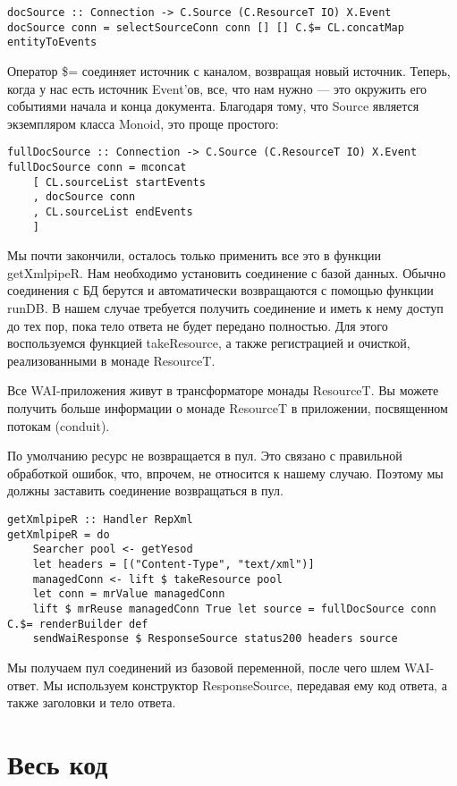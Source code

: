 \begin{lstlisting}
docSource :: Connection -> C.Source (C.ResourceT IO) X.Event
docSource conn = selectSourceConn conn [] [] C.$= CL.concatMap entityToEvents
\end{lstlisting}%

Оператор \$= соединяет источник с каналом, возвращая новый источник. Теперь, когда у нас есть источник Event'ов, все, что нам нужно --- это окружить его событиями начала и конца документа. Благодаря тому, что Source является экземпляром класса Monoid, это проще простого:

\begin{lstlisting}
fullDocSource :: Connection -> C.Source (C.ResourceT IO) X.Event
fullDocSource conn = mconcat
    [ CL.sourceList startEvents
    , docSource conn
    , CL.sourceList endEvents
    ]
\end{lstlisting}

Мы почти закончили, осталось только применить все это в функции getXmlpipeR. Нам необходимо установить соединение с базой данных. Обычно соединения с БД берутся и автоматически возвращаются с помощью функции runDB. В нашем случае требуется получить соединение и иметь к нему доступ до тех пор, пока тело ответа не будет передано полностью. Для этого воспользуемся функцией takeResource, а также регистрацией и очисткой, реализованными в монаде ResourceT.

Все WAI-приложения живут в трансформаторе монады ResourceT. Вы можете получить больше информации о монаде ResourceT в приложении, посвященном потокам (conduit).

По умолчанию ресурс не возвращается в пул. Это связано с правильной обработкой ошибок, что, впрочем, не относится к нашему случаю. Поэтому мы должны заставить соединение возвращаться в пул.

\begin{lstlisting}
getXmlpipeR :: Handler RepXml
getXmlpipeR = do
    Searcher pool <- getYesod
    let headers = [("Content-Type", "text/xml")]
    managedConn <- lift $ takeResource pool
    let conn = mrValue managedConn
    lift $ mrReuse managedConn True let source = fullDocSource conn C.$= renderBuilder def
    sendWaiResponse $ ResponseSource status200 headers source
\end{lstlisting}

Мы получаем пул соединений из базовой переменной, после чего шлем WAI-ответ. Мы используем конструктор ResponseSource, передавая ему код ответа, а также заголовки и тело ответа.

\section{Весь код} %


